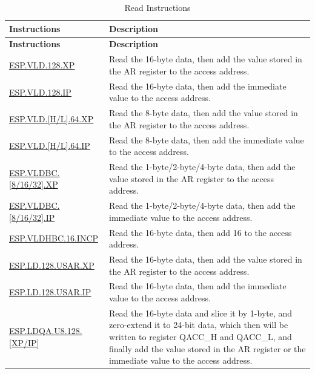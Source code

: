 \begin{longtable}[c]{|l|m{12cm}|}
    \caption{Read Instructions}
    \label{tab:pie-load-instructions}\\
    \hline
    \rowcolor{lightgray}
    \textbf{Instructions} & \textbf{Description} \\\hline
    \endfirsthead
    \rowcolor{lightgray}
    \textbf{Instructions} & \textbf{Description} \\\hline
    \endhead
    \endfoot
    
    \hyperref[instruction:ESPVLD128XP]{ESP.VLD.128.XP} & Read the 16-byte data, then add the value stored in the AR register to the access address.
    \\\hline
    \hyperref[instruction:ESPVLD128IP]{ESP.VLD.128.IP} & Read the 16-byte data, then add the immediate value to the access address.
    \\\hline
    \hyperref[instruction:ESPVLDH64XP]{ESP.VLD.[H/L].64.XP} & Read the 8-byte data, then add the value stored in the AR register to the access address.
    \\\hline
    \hyperref[instruction:ESPVLDH64IP]{ESP.VLD.[H/L].64.IP} & Read the 8-byte data, then add the immediate value to the access address.
    \\\hline
    \hyperref[instruction:ESPVLDBC8XP]{ESP.VLDBC.[8/16/32].XP} & Read the 1-byte/2-byte/4-byte data, then add the value stored in the AR register to the access address.
    \\\hline
    \hyperref[instruction:ESPVLDBC8IP]{ESP.VLDBC.[8/16/32].IP} & Read the 1-byte/2-byte/4-byte data, then add the immediate value to the access address.
    \\\hline
    \hyperref[instruction:ESPVLDHBC16INCP]{ESP.VLDHBC.16.INCP} & Read the 16-byte data, then add 16 to the access address.
    \\\hline
    \hyperref[instruction:ESPLD128USARXP]{ESP.LD.128.USAR.XP} & Read the 16-byte data, then add the value stored in the AR register to the access address.
    \\\hline
    \hyperref[instruction:ESPLD128USARIP]{ESP.LD.128.USAR.IP} & Read the 16-byte data, then add the immediate value to the access address.
    \\\hline
    \hyperref[instruction:ESPLDQAU8128XP]{ESP.LDQA.U8.128.[XP/IP]} & Read the 16-byte data and slice it by 1-byte, and zero-extend it to 24-bit data, which then will be written to register QACC\_H and QACC\_L, and finally add the value stored in the AR register or the immediate value to the access address.

\end{longtable}
